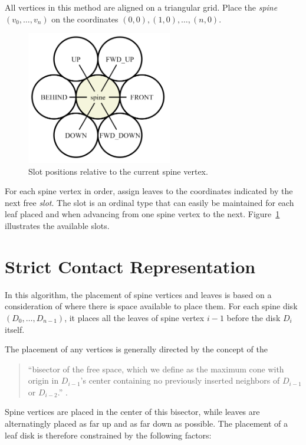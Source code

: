 \documentclass[draft,final]{vutinfth} %
\begin{document}
All vertices in this method are aligned on a triangular grid.
Place the \emph{spine} $(v_0, \ldots , v_n)$ on the coordinates $(0,0), (1,0), \ldots , (n,0)$.

\begin{figure}
    \centering
    \includegraphics[width=180pt]{graphics/slots.png}
    \caption{Slot positions relative to the current spine vertex.}
    \label{fig:slots}
\end{figure}

For each spine vertex in order, assign leaves to the coordinates indicated by the next free \emph{slot}.
The slot is an ordinal type that can easily be maintained for each leaf placed and when advancing from one spine vertex to the next.
Figure~\ref{fig:slots} illustrates the available slots.

\section{Strict Contact Representation}

In this algorithm, the placement of spine vertices and leaves is based on a consideration of where there is space available to place them.
For each spine disk $(D_0, \ldots , D_{n-1})$, it places all the leaves of spine vertex $i-1$ before the disk $D_i$ itself.

The placement of any vertices is generally directed by the concept of the

\begin{quote}
``bisector of the free space, which we define as the maximum cone with origin in $D_{i-1}$'s center containing no previously inserted neighbors of $D_{i-1}$ or $D_{i-2}$.'' \cite{Klemz2015}.
\end{quote}

Spine vertices are placed in the center of this bisector, while leaves are alternatingly placed as far up and as far down as possible.
The placement of a leaf disk is therefore constrained by the following factors:
\end{document}
